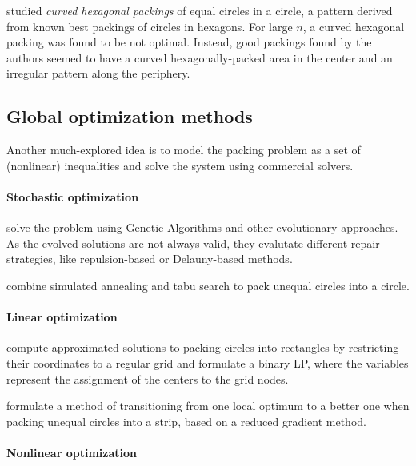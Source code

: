 \documentclass[a4paper,style=print,bibliography=totoc,nexus,lnum,extramargin]{tubsbook}
\begin{document}
\textcite{lubachevsky1997curved} studied \emph{curved hexagonal packings} of equal circles in a circle, a pattern derived from known best packings of circles in hexagons. For large $n$, a curved hexagonal packing was found to be not optimal. Instead, good packings found by the authors seemed to have a curved hexagonally-packed area in the center and an irregular pattern along the periphery.


\subsection{Global optimization methods}

Another much-explored idea is to model the packing problem as a set of (nonlinear) inequalities and solve the system using commercial solvers. 

\paragraph{Stochastic optimization}

\textcite{FMC2015evolutionary} solve the problem using Genetic Algorithms and other evolutionary approaches. As the evolved solutions are not always valid, they evalutate different repair strategies, like repulsion-based or Delauny-based methods.

\textcite{ZD2005effective} combine simulated annealing and tabu search to pack unequal circles into a circle.

\paragraph{Linear optimization}

\textcite{LIE2014approximate} compute approximated solutions to packing circles into rectangles by restricting their coordinates to a regular grid and formulate a binary LP, where the variables represent the assignment of the centers to the grid nodes.

\textcite{SY2004mathematical} formulate a method of transitioning from one local optimum to a better one when packing unequal circles into a strip, based on a reduced gradient method.

\paragraph{Nonlinear optimization}
\end{document}
